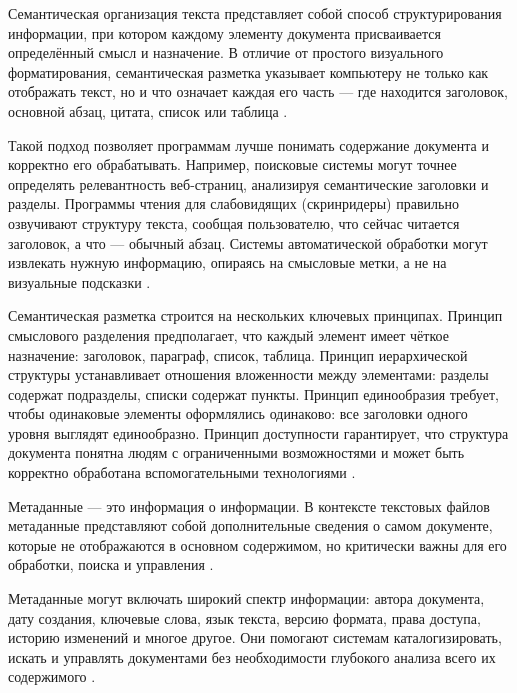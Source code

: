 \documentclass{SibFU-docs}
\begin{document}

Семантическая организация текста представляет собой способ структурирования информации, при котором каждому элементу документа присваивается определённый смысл и назначение. В отличие от простого визуального форматирования, семантическая разметка указывает компьютеру не только как отображать текст, но и что означает каждая его часть — где находится заголовок, основной абзац, цитата, список или таблица \cite{bernerslee2001semanticweb, gilliland2016metadata}.

Такой подход позволяет программам лучше понимать содержание документа и корректно его обрабатывать. Например, поисковые системы могут точнее определять релевантность веб-страниц, анализируя семантические заголовки и разделы. Программы чтения для слабовидящих (скринридеры) правильно озвучивают структуру текста, сообщая пользователю, что сейчас читается заголовок, а что — обычный абзац. Системы автоматической обработки могут извлекать нужную информацию, опираясь на смысловые метки, а не на визуальные подсказки \cite{w3c_html, pdf_xmp}.

Семантическая разметка строится на нескольких ключевых принципах. Принцип смыслового разделения предполагает, что каждый элемент имеет чёткое назначение: заголовок, параграф, список, таблица. Принцип иерархической структуры устанавливает отношения вложенности между элементами: разделы содержат подразделы, списки содержат пункты. Принцип единообразия требует, чтобы одинаковые элементы оформлялись одинаково: все заголовки одного уровня выглядят единообразно. Принцип доступности гарантирует, что структура документа понятна людям с ограниченными возможностями и может быть корректно обработана вспомогательными технологиями \cite{dublincore, markdown_yaml}.


Метаданные — это информация о информации. В контексте текстовых файлов метаданные представляют собой дополнительные сведения о самом документе, которые не отображаются в основном содержимом, но критически важны для его обработки, поиска и управления \cite{gilliland2016metadata, dublincore}.

Метаданные могут включать широкий спектр информации: автора документа, дату создания, ключевые слова, язык текста, версию формата, права доступа, историю изменений и многое другое. Они помогают системам каталогизировать, искать и управлять документами без необходимости глубокого анализа всего их содержимого \cite{pdf_xmp, markdown_yaml}.
\end{document}
